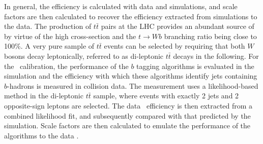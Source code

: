 \documentclass[letterpaper,12pt]{article}
\begin{document}
In general, the efficiency is calculated with data and simulations, 
and scale factors are then calculated to recover the efficiency extracted 
from simulations to the data.
The production of $t\bar{t}$ 
pairs at the LHC provides an abundant source of \bjets by virtue 
of the high cross-section and the $t \rightarrow Wb$ branching ratio 
being close to 100\%. A very pure sample of $t\bar{t}$ events can be 
selected by requiring that both $W$ bosons decay leptonically, 
referred to as di-leptonic $t\bar{t}$ decays in the following.
For the \bjet\ calibration, the performance of the $b$ tagging 
algorithms is evaluated in the simulation and the efficiency 
with which these algorithms identify jets containing $b$-hadrons 
is measured in collision data. The measurement uses a likelihood-based 
method in the di-leptonic $t\bar{t}$ sample, where
events with exactly 2 jets and 2 opposite-sign leptons are selected.  
The data \bjet\ efficiency is 
then extracted from a combined likelihood fit, and subsequently 
compared with that predicted by the simulation. Scale factors are 
then calculated to emulate the performance of the algorithms to the data \cite{FTAG-2018-01}.
\end{document}

